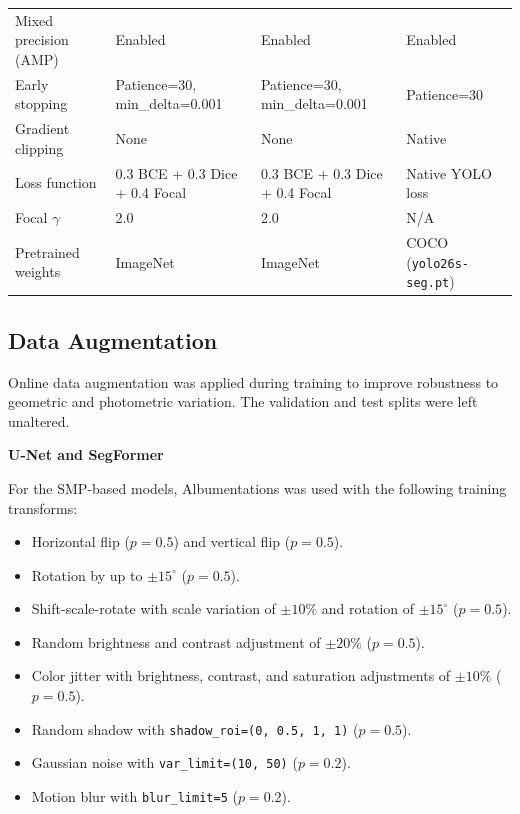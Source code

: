 \begin{table}[htbp]
\begin{tabularx}{\textwidth}{lXXX}
        Mixed precision (AMP) & Enabled                                                       & Enabled                                                       & Enabled                        \\
        Early stopping        & Patience=30, min\_delta=0.001                                 & Patience=30, min\_delta=0.001                                 & Patience=30                    \\
        Gradient clipping     & None                                                          & None                                                          & Native                         \\
        Loss function         & 0.3 BCE + 0.3 Dice + 0.4 Focal                                & 0.3 BCE + 0.3 Dice + 0.4 Focal                                & Native YOLO loss               \\
        Focal $\gamma$        & 2.0                                                           & 2.0                                                           & N/A                            \\
        Pretrained weights    & ImageNet                                                      & ImageNet                                                      & COCO (\texttt{yolo26s-seg.pt}) \\
        \hline
    \end{tabularx}%
\end{table}

\subsection{Data Augmentation}
\label{subsec:data_augmentation}
\hs Online data augmentation was applied during training to improve robustness to geometric and photometric variation. The validation and test splits were left unaltered.

\textbf{U-Net and SegFormer}

\hs For the SMP-based models, Albumentations was used with the following training transforms:
\begin{itemize}
    \item Horizontal flip ($p=0.5$) and vertical flip ($p=0.5$).
    \item Rotation by up to $\pm 15^{\circ}$ ($p=0.5$).
    \item Shift-scale-rotate with scale variation of $\pm 10\%$ and rotation of $\pm 15^{\circ}$ ($p=0.5$).
    \item Random brightness and contrast adjustment of $\pm 20\%$ ($p=0.5$).
    \item Color jitter with brightness, contrast, and saturation adjustments of $\pm 10\%$ ($p=0.5$).
    \item Random shadow with \texttt{shadow\_roi=(0, 0.5, 1, 1)} ($p=0.5$).
    \item Gaussian noise with \texttt{var\_limit=(10, 50)} ($p=0.2$).
    \item Motion blur with \texttt{blur\_limit=5} ($p=0.2$).
\end{itemize}

